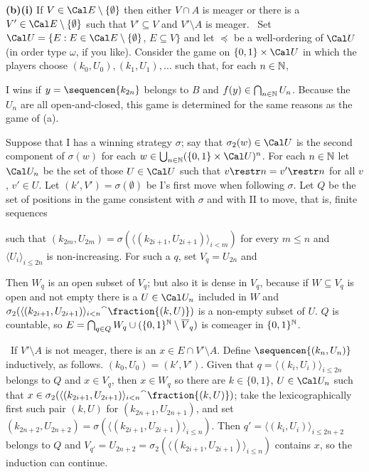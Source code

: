 {\medskip

{\bf (b)(i)} If $V\in\Cal E\setminus\{\emptyset\}$ then
either $V\cap A$ is meager or there is a
$V'\in\Cal E\setminus\{\emptyset\}$ such that $V'\subseteq V$
and $V'\setminus A$ is meager.   \Prf\ Set
$\Cal U=\{E:E\in\Cal E\setminus\{\emptyset\}$, $E\subseteq V\}$
and let $\preccurlyeq$ be a
well-ordering of $\Cal U$ (in order type $\omega$, if you like).
Consider the game on $\{0,1\}\times\Cal U$
in which the players choose $(k_0,U_0),(k_1,U_1),\ldots$ such that,
for each $n\in\Bbb N$,


\noindent I wins if $y=\sequencen{k_{2n}}$ belongs to $B$ and
$f(y)\in\bigcap_{n\in\Bbb N}U_n$.   Because the $U_n$ are all
open-and-closed,
this game is determined for the same reasons as the game of (a).

\medskip

 Suppose that I has a winning strategy $\sigma$;
say that $\sigma_2(w)\in\Cal U$ is the second component of $\sigma(w)$ for each
$w\in\bigcup_{n\in\Bbb N}(\{0,1\}\times\Cal U)^n$.   For each $n\in\Bbb N$
let $\Cal U_n$ be the set of those $U\in\Cal U$ such that
$v\restr n=v'\restr n$ for all $v$, $v'\in U$.   Let
$(k',V')=\sigma(\emptyset)$ be
I's first move when following $\sigma$.   Let $Q$ be the set of
positions in the game consistent with $\sigma$ and with II to move,
that is, finite sequences


\noindent such that
$(k_{2m},U_{2m})=\sigma(\langle(k_{2i+1},U_{2i+1})\rangle_{i<m})$
for every $m\le n$ and $\langle U_i\rangle_{i\le 2n}$ is non-increasing.
For such a $q$, set $V_q=U_{2n}$ and


\noindent Then $W_q$ is an open subset of $V_q$;  but also it is dense in
$V_q$, because if $W\subseteq V_q$ is open and not empty there is a
$U\in\Cal U_n$ included in $W$ and
$\sigma_2({\langle(k_{2i+1},U_{2i+1})\rangle_{i<n}}^{\smallfrown}
  \fraction{(k,U)})$
is a non-empty subset of $U$.    $Q$ is countable, so
$E=\bigcap_{q\in Q}W_q\cup(\{0,1\}^{\Bbb N}\setminus\overline{V}_q)$ is
comeager in $\{0,1\}^{\Bbb N}$.

\Quer\ If $V'\setminus A$ is not meager, there is an
$x\in E\cap V'\setminus A$.
Define $\sequencen{(k_n,U_n)}$ inductively,
as follows.   $(k_0,U_0)=(k',V')$.   Given that
$q=\langle(k_i,U_i)\rangle_{i\le 2n}$ belongs to $Q$ and $x\in V_q$,
then $x\in W_q$ so there are $k\in\{0,1\}$, $U\in\Cal U_n$ such that $x
\in\sigma_2({\langle(k_{2i+1},U_{2i+1})\rangle_{i<n}}^{\smallfrown}
  \fraction{(k,U)})$;
take the
lexicographically first such pair $(k,U)$ for $(k_{2n+1},U_{2n+1})$,
and set
$(k_{2n+2},U_{2n+2})=\sigma(\langle(k_{2i+1},U_{2i+1})\rangle_{i\le n})$.
Then $q'=\langle(k_i,U_i)\rangle_{i\le 2n+2}$ belongs to $Q$
and $V_{q'}=U_{2n+2}=\sigma_2(\langle(k_{2i+1},U_{2i+1})\rangle_{i\le n})$
contains $x$, so the induction can continue.

}

